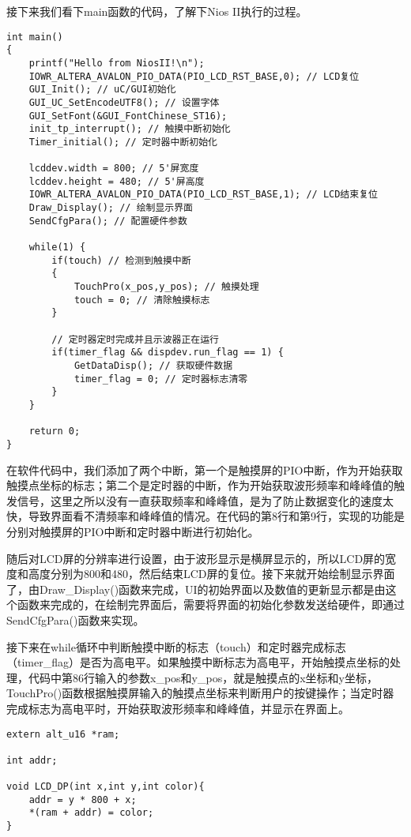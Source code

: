\documentclass[lang=cn,a4paper,newtx]{elegantpaper}
\begin{document}
接下来我们看下main函数的代码，了解下Nios II执行的过程。
\begin{lstlisting}
int main() 
{
	printf("Hello from NiosII!\n");
	IOWR_ALTERA_AVALON_PIO_DATA(PIO_LCD_RST_BASE,0); // LCD复位
	GUI_Init(); // uC/GUI初始化
	GUI_UC_SetEncodeUTF8(); // 设置字体
	GUI_SetFont(&GUI_FontChinese_ST16);
	init_tp_interrupt(); // 触摸中断初始化
	Timer_initial(); // 定时器中断初始化
	
	lcddev.width = 800; // 5'屏宽度
	lcddev.height = 480; // 5'屏高度
	IOWR_ALTERA_AVALON_PIO_DATA(PIO_LCD_RST_BASE,1); // LCD结束复位
	Draw_Display(); // 绘制显示界面
	SendCfgPara(); // 配置硬件参数
	
	while(1) {
		if(touch) // 检测到触摸中断
		{
			TouchPro(x_pos,y_pos); // 触摸处理
			touch = 0; // 清除触摸标志
		}
		
		// 定时器定时完成并且示波器正在运行
		if(timer_flag && dispdev.run_flag == 1) {
			GetDataDisp(); // 获取硬件数据
			timer_flag = 0; // 定时器标志清零
		}
	}
	
	return 0;
}
\end{lstlisting}
在软件代码中，我们添加了两个中断，第一个是触摸屏的PIO中断，作为开始获取触摸点坐标的标志；第二个是定时器的中断，作为开始获取波形频率和峰峰值的触发信号，这里之所以没有一直获取频率和峰峰值，是为了防止数据变化的速度太快，导致界面看不清频率和峰峰值的情况。在代码的第8行和第9行，实现的功能是分别对触摸屏的PIO中断和定时器中断进行初始化。

随后对LCD屏的分辨率进行设置，由于波形显示是横屏显示的，所以LCD屏的宽度和高度分别为800和480，然后结束LCD屏的复位。接下来就开始绘制显示界面了，由Draw\_Display()函数来完成，UI的初始界面以及数值的更新显示都是由这个函数来完成的，在绘制完界面后，需要将界面的初始化参数发送给硬件，即通过SendCfgPara()函数来实现。

接下来在while循环中判断触摸中断的标志（touch）和定时器完成标志（timer\_flag）是否为高电平。如果触摸中断标志为高电平，开始触摸点坐标的处理，代码中第86行输入的参数x\_pos和y\_pos，就是触摸点的x坐标和y坐标，TouchPro()函数根据触摸屏输入的触摸点坐标来判断用户的按键操作；当定时器完成标志为高电平时，开始获取波形频率和峰峰值，并显示在界面上。
\begin{lstlisting}
extern alt_u16 *ram;

int addr;

void LCD_DP(int x,int y,int color){
	addr = y * 800 + x;
	*(ram + addr) = color;
}
\end{lstlisting}
\end{document}
